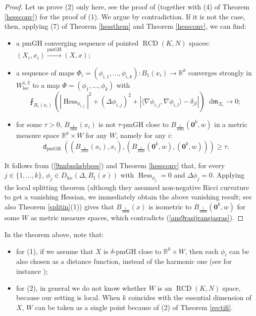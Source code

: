 \documentclass[11pt,reqno]{amsart}
\theoremstyle{definition}
\numberwithin{equation}{section}
\newcommand{\di}{\mathop{}\!\mathrm{d}}
\newcommand{\meas}{\mathfrak{m}}
\DeclareMathOperator{\dist}{\mathsf{d}}
\DeclareMathOperator{\Hess}{Hess}
\DeclareMathOperator{\loc}{loc}
\DeclareMathOperator{\RCD}{RCD}
\begin{document}
\begin{proof}
    Let us prove (2) only here, see the proof of \cite[Proposition 1.4]{BPS} (together with (4) of Theorem \ref{hessconv}) for the proof of (1).  
    We argue by contradiction. If it is not the case, then, applying (7) of Theorem \ref{hessthem} and Theorem \ref{hessconv}, we can find:
    \begin{itemize}
        \item a pmGH converging sequence of pointed $\RCD(K, N)$ spaces:
        $
            (X_i, x_i) \stackrel{\mathrm{pmGH}}{\to} (X, x)$;
        \item a sequence of maps $\Phi_i=(\phi_{i,1}, \ldots, \phi_{i,k}):B_1(x_i) \to \mathbb{R}^k$ converges strongly in $W^{1,2}_{\loc}$ to a map $\Phi=(\phi_1, \ldots, \phi_k)$ with
        \begin{equation}\label{9nnbsshsbbess}
            \fint_{B_1(x_i)}\left(|\Hess_{\phi_{i, j}}|^2 + (\Delta \phi_{i, j})^2 +\left|\langle \nabla \phi_{i, j}, \nabla \phi_{i, l}\rangle -\delta_{jl}\right|\right)\di \meas_{X_i} \to 0;
        \end{equation}
        \item for some $\tau>0$, $B_{\frac{1}{100n}}(x_i)$ is not $\tau$-pmGH close to $B_{\frac{1}{100n}}(\mathbf{0}^k, w)$ in a metric measure space $\mathbb{R}^k \times W$ for any $W$, namely for any $i$:
        \begin{equation}\label{ans9rasijransjasras}
            \dist_{\mathrm{pmGH}}\left(\left( B_{\frac{1}{100n}}(x_i), x_i\right), \left(B_{\frac{1}{100n}}(\mathbf{0}^k, w), (\mathbf{0}^k, w)\right) \right) \ge \tau.
        \end{equation}
    \end{itemize}
    It follows from (\ref{9nnbsshsbbess}) and Theorem \ref{hessconv} that, for every $j\in \{1,\ldots, k\}$, $\phi_j \in D_{\loc}(\Delta, B_1(x))$ with $\Hess_{\phi_j}=0$ and $\Delta \phi_j =0$.
    Applying the local splitting theorem  \cite[Theorem 3.4]{BNS} (although they assumed   non-negative  Ricci curvature to get a vanishing Hessian, we immediately obtain the above   vanishing result; see also Theorem \ref{splitin}(1)) gives that $B_{\frac{1}{100n}}(x)$ is isometric to $B_{\frac{1}{100n}}(\mathbf{0}^k, w)$ for some $W$ as metric measure spaces, which contradicts (\ref{ans9rasijransjasras}).
\end{proof}
In the theorem above, note that:
\begin{itemize}
\item for (1), if we assume that $X$ is $\delta$-pmGH close to $\mathbb{R}^k\times W$, then each $\phi_i$ can be also chosen as a distance function, instead of the harmonic one (see for instance \cite{MN});
    \item for (2), in general we do not know whether $W$ is an $\RCD(K, N)$ space, because our setting is local. When $k$ coincides with the essential dimension of $X$, $W$ can be taken as a single point because of (2) of Theorem \ref{rectifi}.
\end{itemize}
\end{document}
